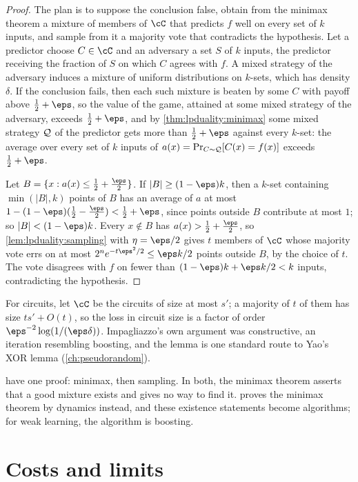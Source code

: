 \begin{refsection}
\begin{proof}
The plan is to suppose the conclusion false, obtain from the minimax theorem a mixture of members of $\cC$ that predicts $f$ well on every set of $k$ inputs, and sample from it a majority vote that contradicts the hypothesis. Let a predictor choose $C\in\cC$ and an adversary a set $S$ of $k$ inputs, the predictor receiving the fraction of $S$ on which $C$ agrees with $f$. A mixed strategy of the adversary induces a mixture of uniform distributions on $k$-sets, which has density $\delta$. If the conclusion fails, then each such mixture is beaten by some $C$ with payoff above $\frac12+\eps$, so the value of the game, attained at some mixed strategy of the adversary, exceeds $\frac12+\eps$, and by \cref{thm:lpduality:minimax} some mixed strategy $\mathcal{Q}$ of the predictor gets more than $\frac12+\eps$ against every $k$-set: the average over every set of $k$ inputs of $a(x)=\Pr_{C\sim\mathcal{Q}}[C(x)=f(x)]$ exceeds $\frac12+\eps$.

Let $B=\{x:a(x)\le\frac12+\frac\eps2\}$. If $|B|\ge(1-\eps)k$, then a $k$-set containing $\min(|B|,k)$ points of $B$ has an average of $a$ at most $1-(1-\eps)(\frac12-\frac\eps2)<\frac12+\eps$, since points outside $B$ contribute at most $1$; so $|B|<(1-\eps)k$. Every $x\notin B$ has $a(x)>\frac12+\frac\eps2$, so \cref{lem:lpduality:sampling} with $\eta=\eps/2$ gives $t$ members of $\cC$ whose majority vote errs on at most $2^ne^{-t\eps^2/2}\le\eps k/2$ points outside $B$, by the choice of $t$. The vote disagrees with $f$ on fewer than $(1-\eps)k+\eps k/2<k$ inputs, contradicting the hypothesis.
\end{proof}

For circuits, let $\cC$ be the circuits of size at most $s'$; a majority of $t$ of them has size $ts'+O(t)$, so the loss in circuit size is a factor of order $\eps^{-2}\log(1/(\eps\delta))$. Impagliazzo's own argument was constructive, an iteration resembling boosting, and the lemma is one standard route to Yao's XOR lemma (\cref{ch:pseudorandom}).

 have one proof: minimax, then sampling. In both, the minimax theorem asserts that a good mixture exists and gives no way to find it.  proves the minimax theorem by dynamics instead, and these existence statements become algorithms; for weak learning, the algorithm is boosting.

\section{Costs and limits}\label{sec:lpduality:costs}


\end{refsection}
